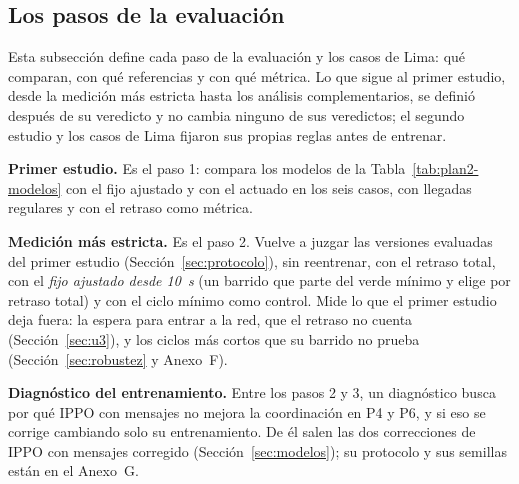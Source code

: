 \subsection{Los pasos de la evaluación}
\label{sec:diseno-segundo}

Esta subsección define cada paso de la evaluación y los casos de Lima:
qué comparan, con qué referencias y con qué métrica. Lo que sigue al
primer estudio, desde la medición más estricta hasta los análisis
complementarios, se definió después de su veredicto y no cambia ninguno
de sus veredictos; el segundo estudio y los casos de Lima fijaron sus
propias reglas antes de entrenar.

\noindent\textbf{Primer estudio.} Es el paso 1: compara los modelos de
la Tabla~\ref{tab:plan2-modelos} con el fijo ajustado y con el actuado
en los seis casos, con llegadas regulares y con el retraso como métrica.

\label{sec:diseno-robustez}
\noindent\textbf{Medición más estricta.} Es el paso 2. Vuelve a juzgar
las versiones evaluadas del primer estudio (Sección~\ref{sec:protocolo}),
sin reentrenar, con el retraso total, con el \emph{fijo ajustado desde
10~s} (un barrido que parte del verde mínimo y elige por retraso total)
y con el ciclo mínimo como control.
Mide lo que el primer estudio deja fuera: la espera para entrar a la
red, que el retraso no cuenta (Sección~\ref{sec:u3}), y los ciclos más
cortos que su barrido no prueba (Sección~\ref{sec:robustez} y
Anexo~F).

\noindent\textbf{Diagnóstico del entrenamiento.} Entre los pasos 2 y 3,
un diagnóstico busca por qué IPPO con mensajes no mejora la coordinación
en P4 y P6, y si eso se corrige cambiando solo su entrenamiento. De él
salen las dos correcciones de IPPO con mensajes corregido
(Sección~\ref{sec:modelos}); su protocolo y sus semillas están en el
Anexo~G.

